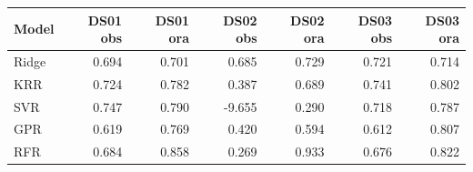\begin{tabular}{lrrrrrr}
\toprule
Model & DS01 obs & DS01 ora & DS02 obs & DS02 ora & DS03 obs & DS03 ora \\
\midrule
Ridge & 0.694 & 0.701 & 0.685 & 0.729 & 0.721 & 0.714 \\
KRR & 0.724 & 0.782 & 0.387 & 0.689 & 0.741 & 0.802 \\
SVR & 0.747 & 0.790 & -9.655 & 0.290 & 0.718 & 0.787 \\
GPR & 0.619 & 0.769 & 0.420 & 0.594 & 0.612 & 0.807 \\
RFR & 0.684 & 0.858 & 0.269 & 0.933 & 0.676 & 0.822 \\
\bottomrule
\end{tabular}
